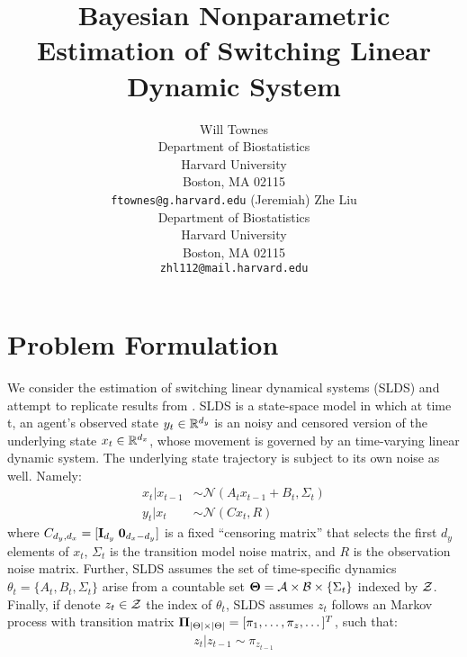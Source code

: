 \documentclass{article} %
\title{Bayesian Nonparametric Estimation of Switching Linear Dynamic System}
\author{
Will Townes \\
Department of Biostatistics\\
Harvard University\\
Boston, MA 02115 \\
\texttt{ftownes@g.harvard.edu}
\And
(Jeremiah) Zhe Liu \\
Department of Biostatistics\\
Harvard University\\
Boston, MA 02115 \\
\texttt{zhl112@mail.harvard.edu}
}
\begin{document}
\maketitle
\vspace*{-4em}
\tableofcontents
\thispagestyle{empty}
\newpage
\setcounter{page}{1}



\section{Problem Formulation}

We consider the estimation of switching linear dynamical systems (SLDS) and attempt to replicate results from \cite{fox_bayesian_2009}. SLDS is a state-space model in which at time t, an agent's observed state $y_t \in {\mathbb R}^{d_y}$ is an noisy and censored version of the underlying state $x_t \in {\mathbb R}^{d_x}$, whose movement is governed by an time-varying linear dynamic system. The underlying state trajectory is subject to its own noise as well. Namely:
\begin{align} \label{eq:lds1}
x_t|x_{t-1}&\sim\mathcal{N}(A_t x_{t-1} + B_t,\Sigma_t) \\
y_t|x_t&\sim\mathcal{N}(C x_t,R)
\end{align}
where $C_{d_y, d_x} = [{\bf I}_{d_y} \; {\bf 0}_{d_x - d_y} ]$ is a fixed ``censoring matrix'' that selects the first $d_y$ elements of $x_t$, $\Sigma_t$ is the transition model noise matrix, and $R$ is the observation noise matrix. Further, SLDS assumes the set of time-specific dynamics $\theta_t = \{A_t, B_t, \Sigma_t\}$ arise from a countable set $\boldsymbol{\Theta} = {\cal A} \times {\cal B} \times \{\Sigma_t\}$ indexed by ${\cal Z}$. Finally, if denote $z_t \in {\cal Z}$ the index of $\theta_t$, SLDS assumes $z_t$ follows an Markov process with transition matrix $\boldsymbol{\Pi}_{|\Theta| \times |\Theta|} = [\pi_1, \dots, \pi_z, \dots]^T$, such that:
\begin{align*}
z_t | z_{t-1} \sim \pi_{z_{t-1}}
\end{align*}
\end{document}
